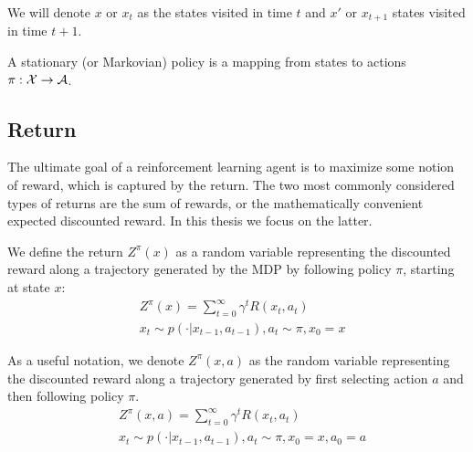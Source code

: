 We will denote $x$ or $x_t$ as the states visited in time $t$ and $x'$ or $x_{t+1}$ states visited in time $t+1$. 

\begin{definition}
A stationary (or Markovian) policy is a mapping from states to actions $\pi:\mathcal{X} \to \mathcal{A}$.
\end{definition}


\subsection{Return}

The ultimate goal of a reinforcement learning agent is to maximize some notion of reward, which is captured by the return. The two most commonly considered types of returns are the sum of rewards, or the mathematically convenient expected discounted reward. In this thesis we focus on the latter.


We define the return $Z^\pi(x)$ as a random variable representing the discounted reward along a trajectory generated by the MDP by following policy $\pi$, starting at state $x$:
\begin{equation}\label{eqn:return}
\begin{split}
&Z^\pi(x)=\sum_{t=0}^\infty \gamma^tR(x_t,a_t)\\
&x_t \sim p(\cdot|x_{t-1}, a_{t-1}), a_t \sim \pi, x_0 = x
\end{split}
\end{equation}

As a useful notation, we denote $Z^\pi(x, a)$ as the random variable representing the discounted reward along a trajectory generated by first selecting action $a$ and then following policy $\pi$.
\begin{equation}
\begin{split}
&Z^\pi(x, a)=\sum_{t=0}^\infty \gamma^tR(x_t,a_t)\\
&x_t \sim p(\cdot|x_{t-1}, a_{t-1}), a_t \sim \pi, x_0 = x, a_0 = a
\end{split}
\end{equation}

